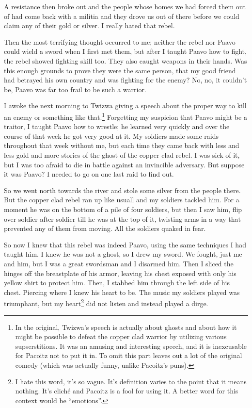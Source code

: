 A resistance then broke out and the people whose homes we had forced them out of had come back with a militia and they drove us out of there before we could claim any of their gold or silver. I really hated that rebel.

Then the most terrifying thought occurred to me; neither the rebel nor Paavo could wield a sword when I first met them, but after I taught Paavo how to fight, the rebel showed fighting skill too. They also caught weapons in their hands. Was this enough grounds to prove they were the same person, that my good friend had betrayed his own country and was fighting for the enemy? No, no, it couldn't be, Paavo was far too frail to be such a warrior.

\tbreak

I awoke the next morning to Twizwa giving a speech about the proper way to kill an enemy or something like that.\footnote{In the original, Twizwa's speech is actually about ghosts and about how it might be possible to defeat the copper clad warrior by utilizing various supserstitions. It was an amusing and interesting speech, and it is inexcusable for Pacoitz not to put it in. To omit this part leaves out a lot of the original comedy (which was actually funny, unlike Pacoitz's puns).}
Forgetting my suspicion that Paavo might be a traitor, I taught Paavo how to wrestle; he learned very quickly and over the course of that week he got very good at it. My soldiers made some raids throughout that week without me, but each time they came back with less and less gold and more stories of the ghost of the copper clad rebel. I was sick of it, but I was too afraid to die in battle against an invincible adversary. But suppose it was Paavo? I needed to go on one last raid to find out.

So we went north towards the river and stole some silver from the people there. But the copper clad rebel ran up like usuall and my soldiers tackled him. For a moment he was on the bottom of a pile of four soldiers, but then I saw him, flip over soldier after soldier till he was at the top of it, twisting arms in a way that prevented any of them from moving. All the soldiers quaked in fear.

So now I knew that this rebel was indeed Paavo, using the same techniques I had taught him. I knew he was not a ghost, so I drew my sword. We fought, just me and him, but I was a great swordsman and I disarmed him. Then I sliced the hinges off the breastplate of his armor, leaving his chest exposed with only his yellow shirt to protect him. Then, I stabbed him through the left side of his chest. Piercing where I knew his heart to be. The music my soldiers played was triumphant, but my heart\footnote{I hate this word, it's so vague. It's definition varies to the point that it means nothing. It's clich\'{e} and Pacoitz is a fool for using it. A better word for this context would be ``emotions''.} did not listen and instead played a dirge. 

